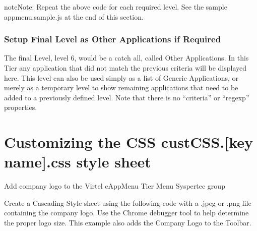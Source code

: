 \documentclass[letterpaper,10pt,english]{sphinxmanual}
\begin{document}
\begin{sphinxadmonition}{note}{Note:}
Repeat the above code for each required level. See the sample appmenu.sample.js at the end of this section.
\end{sphinxadmonition}


\subsubsection{Setup Final Level as Other Applications if Required}
\label{\detokenize{Customization:setup-final-level-as-other-applications-if-required}}
The final Level, level 6,  would be a catch all, called Other Applications.  In this Tier any application that did not match the previous criteria will be displayed here. This level can also be used simply as a list of Generic Applications, or merely as a temporary level to show remaining applications that need to be added to a previously defined level. Note that there is no “criteria” or “regexp” properties.


\begin{sphinxVerbatim}[commandchars=\\\{\}]
               
\PYG{p}{[}\PYG{p}{]}\PYG{p}{[}\PYG{p}{]}   

\end{sphinxVerbatim}


\section{Customizing the CSS custCSS.{[}key name{]}.css style sheet}
\label{\detokenize{Customization:customizing-the-css-custcss-key-name-css-style-sheet}}
Add company logo to the Virtel cAppMenu Tier Menu Syspertec group


Create a Cascading Style sheet using the following code with a .jpeg or .png file containing the company logo. Use the Chrome debugger tool to help determine the proper logo size. This example also adds the Company Logo to the Toolbar.
\end{document}
